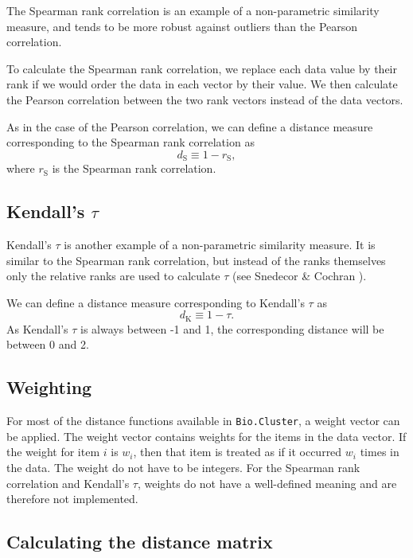 \documentclass{report}
\begin{document}
The Spearman rank correlation is an example of a non-parametric similarity measure, and tends to be more robust against outliers than the Pearson correlation.

To calculate the Spearman rank correlation, we replace each data value by their rank if we would order the data in each vector by their value. We then calculate the Pearson correlation between the two rank vectors instead of the data vectors.

As in the case of the Pearson correlation, we can define a distance measure corresponding to the Spearman rank correlation as
$$d_{\mbox{S}} \equiv 1 - r_{\mbox{S}},$$
where
$r_{\mbox{S}}$
is the Spearman rank correlation.

\subsection*{Kendall's $\tau$}

Kendall's $\tau$
is another example of a non-parametric similarity measure. It is similar to the Spearman rank correlation, but instead of the ranks themselves only the relative ranks are used to calculate $\tau$ (see Snedecor \& Cochran \cite{snedecor1989}).

We can define a distance measure corresponding to Kendall's $\tau$
as $$d_{\mbox{K}} \equiv 1 - \tau.$$
As Kendall's $\tau$ is always between -1 and 1, the corresponding distance will be between 0 and 2.

\subsection*{Weighting}

For most of the distance functions available in \verb|Bio.Cluster|, a weight vector can be applied. The weight vector contains weights for the items in the data vector. If the weight for item $i$ is $w_i$, then that item is treated as if it occurred $w_i$ times in the data. The weight do not have to be integers.
For the Spearman rank correlation and Kendall's
$\tau$,
weights do not have a well-defined meaning and are therefore not implemented.

\subsection*{Calculating the distance matrix}
\label{subsec:distancematrix}
\end{document}
